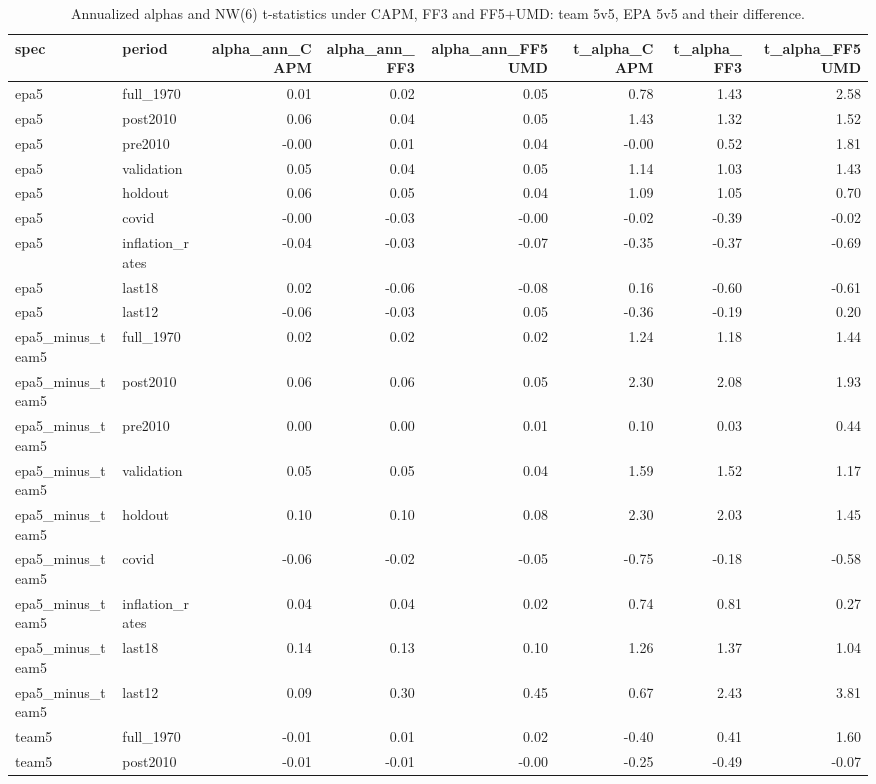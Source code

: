 \begin{table}
\caption{Annualized alphas and NW(6) t-statistics under CAPM, FF3 and FF5+UMD: team 5v5, EPA 5v5 and their difference.}
\label{tab:m4_alpha_grid}
\begin{tabular}{llrrrrrr}
\toprule
spec & period & alpha\_ann\_CAPM & alpha\_ann\_FF3 & alpha\_ann\_FF5UMD & t\_alpha\_CAPM & t\_alpha\_FF3 & t\_alpha\_FF5UMD \\
\midrule
epa5 & full\_1970 & 0.01 & 0.02 & 0.05 & 0.78 & 1.43 & 2.58 \\
epa5 & post2010 & 0.06 & 0.04 & 0.05 & 1.43 & 1.32 & 1.52 \\
epa5 & pre2010 & -0.00 & 0.01 & 0.04 & -0.00 & 0.52 & 1.81 \\
epa5 & validation & 0.05 & 0.04 & 0.05 & 1.14 & 1.03 & 1.43 \\
epa5 & holdout & 0.06 & 0.05 & 0.04 & 1.09 & 1.05 & 0.70 \\
epa5 & covid & -0.00 & -0.03 & -0.00 & -0.02 & -0.39 & -0.02 \\
epa5 & inflation\_rates & -0.04 & -0.03 & -0.07 & -0.35 & -0.37 & -0.69 \\
epa5 & last18 & 0.02 & -0.06 & -0.08 & 0.16 & -0.60 & -0.61 \\
epa5 & last12 & -0.06 & -0.03 & 0.05 & -0.36 & -0.19 & 0.20 \\
epa5\_minus\_team5 & full\_1970 & 0.02 & 0.02 & 0.02 & 1.24 & 1.18 & 1.44 \\
epa5\_minus\_team5 & post2010 & 0.06 & 0.06 & 0.05 & 2.30 & 2.08 & 1.93 \\
epa5\_minus\_team5 & pre2010 & 0.00 & 0.00 & 0.01 & 0.10 & 0.03 & 0.44 \\
epa5\_minus\_team5 & validation & 0.05 & 0.05 & 0.04 & 1.59 & 1.52 & 1.17 \\
epa5\_minus\_team5 & holdout & 0.10 & 0.10 & 0.08 & 2.30 & 2.03 & 1.45 \\
epa5\_minus\_team5 & covid & -0.06 & -0.02 & -0.05 & -0.75 & -0.18 & -0.58 \\
epa5\_minus\_team5 & inflation\_rates & 0.04 & 0.04 & 0.02 & 0.74 & 0.81 & 0.27 \\
epa5\_minus\_team5 & last18 & 0.14 & 0.13 & 0.10 & 1.26 & 1.37 & 1.04 \\
epa5\_minus\_team5 & last12 & 0.09 & 0.30 & 0.45 & 0.67 & 2.43 & 3.81 \\
team5 & full\_1970 & -0.01 & 0.01 & 0.02 & -0.40 & 0.41 & 1.60 \\
team5 & post2010 & -0.01 & -0.01 & -0.00 & -0.25 & -0.49 & -0.07 \\

\end{tabular}
\end{table}
